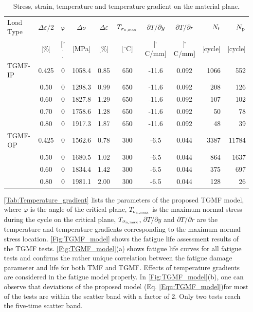 \documentclass[preprint,5p,twocolumn,10pt,sort&compress]{elsarticle}
\begin{document}
\begin{table}
  \centering
  \caption{Stress, strain, temperature and temperature gradient on the material plane.}
    \begin{tabular}{lcccccccrr}
    \toprule
    Load Type & $\Delta\varepsilon/2$ & $\varphi$ & $\Delta\sigma$ & $\Delta\varepsilon$ & $T_{\sigma_{\rm n,\max}}$   & $\partial T/\partial y$ & $\partial T/\partial r$ & $N_{\rm{f}}$ & $N_{\rm{p}}$ \\
          & [\%]  & [$^{\circ}$] & [MPa] & [\%]  & [$^\circ$C]   & [$^\circ$C/mm] & [$^\circ$C/mm] & [cycle] & [cycle] \\
    \midrule
    TGMF-IP & 0.425   & 0     & 1058.4  & 0.85  & 650   & -11.6  & 0.092  & 1066  & 552 \\
      & 0.50   & 0     & 1298.3  & 0.99  & 650   & -11.6  & 0.092  & 208   & 126 \\
      & 0.60   & 0     & 1827.8  & 1.29  & 650   & -11.6  & 0.092  & 107   & 102 \\
      & 0.70   & 0     & 1758.6  & 1.28  & 650   & -11.6  & 0.092  & 50    & 78 \\
      & 0.80   & 0     & 1917.3  & 1.87  & 650   & -11.6  & 0.092  & 48    & 39 \\
    \midrule
    TGMF-OP & 0.425   & 0     & 1562.6  & 0.78  & 300   & -6.5  & 0.044  & 3387  & 11784 \\
      & 0.50   & 0     & 1680.5  & 1.02  & 300   & -6.5  & 0.044  & 864   & 1637 \\
      & 0.60   & 0     & 1834.4  & 1.42  & 300   & -6.5  & 0.044  & 375   & 697 \\
      & 0.80   & 0     & 1981.1  & 2.00  & 300   & -6.5  & 0.044  & 128   & 26 \\
    \bottomrule
    \end{tabular}%
  \label{Tab:Temperature_gradient}%
\end{table}%

\autoref{Tab:Temperature_gradient} lists the parameters of the proposed TGMF model, where $\varphi$ is the angle of the critical plane, $T_{\sigma_{\rm n,\max}}$ is the maximum normal stress during the cycle on the critical plane, $T_{\sigma_{\rm n,\max}}$, $\partial T/\partial y$ and $\partial T/\partial r$ are the temperature and temperature gradients corresponding to the maximum normal stress location.
\autoref{Fig:TGMF_model} shows the fatigue life assessment results of the TGMF tests. \autoref{Fig:TGMF_model}(a) shows fatigue life curves for all fatigue tests and confirms the rather unique correlation between the fatigue damage parameter and life for both TMF and TGMF. Effects of temperature gradients are considered in the fatigue model properly. In \autoref{Fig:TGMF_model}(b), one can observe that deviations of the proposed model (Eq. \eqref{Equ:TGMF_model})for most of the tests are within the scatter band with a factor of 2. Only two tests reach the five-time scatter band. 
\end{document}
